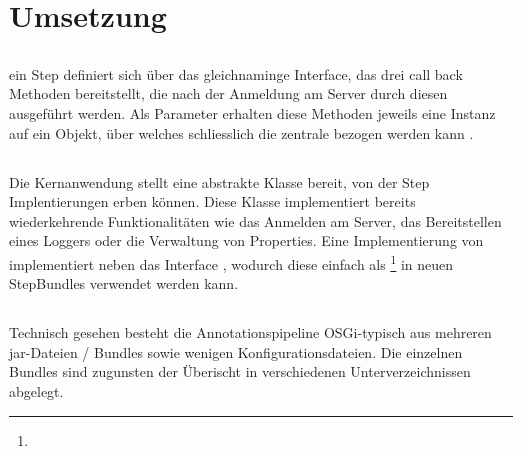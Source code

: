 \chapter{Umsetzung}

\section{}
ein Step definiert sich über das gleichnaminge Interface, das drei call back
Methoden bereitstellt, die nach der Anmeldung am Server durch diesen ausgeführt
werden.
Als Parameter erhalten diese Methoden jeweils eine Instanz auf ein
 Objekt, über welches schliesslich die zentrale 
bezogen werden kann .
\\



\section{}
Die Kernanwendung  stellt eine abstrakte Klasse bereit, von der
Step Implentierungen erben können.
Diese Klasse implementiert bereits wiederkehrende Funktionalitäten wie das
Anmelden am Server, das Bereitstellen eines Loggers oder die Verwaltung von
Properties.
Eine Implementierung von  implementiert neben  das
Interface , wodurch diese einfach als
\footnote{}
in neuen StepBundles verwendet werden kann. 

\section{}


\subsection{}

\subsection{}

Technisch gesehen besteht die Annotationspipeline OSGi-typisch aus mehreren
jar-Dateien / Bundles sowie wenigen Konfigurationsdateien.
Die einzelnen Bundles sind zugunsten der Überischt in verschiedenen
Unterverzeichnissen abgelegt.

